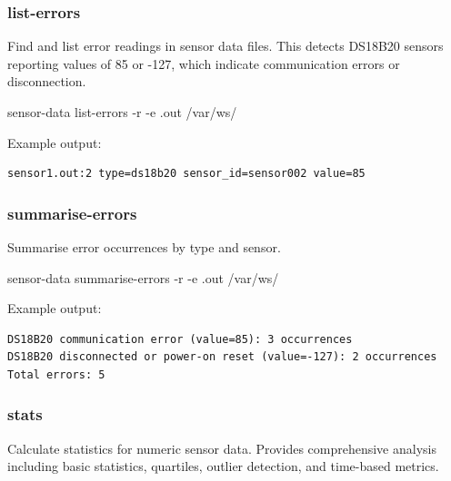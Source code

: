 \documentclass[
]{book}
\newenvironment{Shaded}{\begin{snugshade}}{\end{snugshade}}
\newcommand{\AttributeTok}[1]{\textcolor[rgb]{0.13,0.29,0.53}{#1}}
\newcommand{\ExtensionTok}[1]{#1}
\newcommand{\NormalTok}[1]{#1}
\begin{document}
\subsubsection{list-errors}\label{list-errors}

Find and list error readings in sensor data files. This detects DS18B20 sensors reporting values of 85 or -127, which indicate communication errors or disconnection.

\begin{Shaded}
\begin{Highlighting}[]
\ExtensionTok{sensor{-}data}\NormalTok{ list{-}errors }\AttributeTok{{-}r} \AttributeTok{{-}e}\NormalTok{ .out /var/ws/}
\end{Highlighting}
\end{Shaded}

Example output:

\begin{verbatim}
sensor1.out:2 type=ds18b20 sensor_id=sensor002 value=85
\end{verbatim}

\subsubsection{summarise-errors}\label{summarise-errors}

Summarise error occurrences by type and sensor.

\begin{Shaded}
\begin{Highlighting}[]
\ExtensionTok{sensor{-}data}\NormalTok{ summarise{-}errors }\AttributeTok{{-}r} \AttributeTok{{-}e}\NormalTok{ .out /var/ws/}
\end{Highlighting}
\end{Shaded}

Example output:

\begin{verbatim}
DS18B20 communication error (value=85): 3 occurrences
DS18B20 disconnected or power-on reset (value=-127): 2 occurrences
Total errors: 5
\end{verbatim}

\subsubsection{stats}\label{stats}

Calculate statistics for numeric sensor data. Provides comprehensive analysis including basic statistics, quartiles, outlier detection, and time-based metrics.
\end{document}
